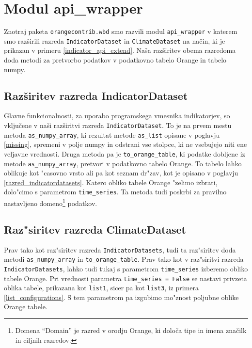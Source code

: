 \section{Modul api\_wrapper}


Znotraj paketa \verb|orangecontrib.wbd| smo razvili modul \verb|api_wrapper| v
katerem smo razširili razreda \verb|IndicatorDataset| in \verb|ClimateDataset|
na način, ki je prikazan v primeru \ref{indicator_api_extend}. Naša
razširitev obema razredoma doda metodi za pretvorbo podatkov v podatkovno 
tabelo Orange in tabelo numpy.

\subsection{Razširitev razreda IndicatorDataset}

Glavne funkcionalnosti, za uporabo programskega vmesnika indikatorjev, so
vključene v naši razširitvi razreda \verb|IndicatorDataset|. To je na prvem
mestu metoda \verb|as_numpy_array|, ki rezultat metode \verb|as_list|
opisane v poglavju \ref{missing}, spremeni v polje numpy in odstrani vse
stolpce, ki ne vsebujejo niti ene veljavne vrednosti. Druga metoda pa je
\verb|to_orange_table|, ki podatke dobljene iz metode \verb|as_numpy_array|,
pretvori v podatkovno tabelo Orange. To tabelo lahko oblikuje kot "casovno
vrsto ali pa kot seznam dr"zav, kot je opisano v poglavju 
\ref{razred_indicatordatasets}. Katero obliko tabele Orange "zelimo izbrati,
dolo"cimo s parametrom \verb|time_series|. %
Ta metoda tudi poskrbi za pravilno nastavljeno domeno\footnote{Domena
``Domain'' je razred v orodju Orange, ki določa tipe in imena značilk in
ciljnih razredov.} podatkov.


\subsection{Raz"siritev razreda ClimateDataset}
\label{razsiritev_razreda_climatedataset}

Prav tako kot raz"siritev razreda \verb|IndicatorDatasets|, tudi ta raz"siritev
doda metodi \verb|as_numpy_array| in \verb|to_orange_table|. Prav tako kot v
raz"siritvi razreda \verb|IndicatorDatasets|, lahko tudi tukaj s parametrom
\verb|time_series| izberemo obliko tabele Orange. Pri vrednosti parametra 
\verb|time_series = False| se nastavi privzeta oblika tabele, prikazana kot
\verb|list1|, sicer pa kot \verb|list3|, iz primera \ref{list_configurations}.
S tem parametrom pa izgubimo mo"znost poljubne oblike Orange tabele.


